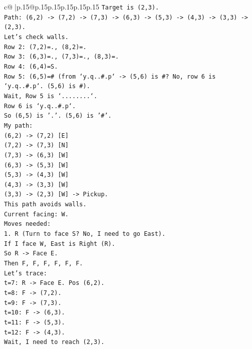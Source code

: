 \documentclass{article}
\begin{document}
{\begin{supertabular}{c@{$\;$}|p{.15\linewidth}@{}p{.15\linewidth}p{.15\linewidth}p{.15\linewidth}p{.15\linewidth}p{.15\linewidth}}
{{{\texttt{Target is (2,3).} \\
\texttt{Path: (6,2) {-}> (7,2) {-}> (7,3) {-}> (6,3) {-}> (5,3) {-}> (4,3) {-}> (3,3) {-}> (2,3).} \\
\texttt{Let's check walls.} \\
\texttt{Row 2: (7,2)=., (8,2)=.} \\
\texttt{Row 3: (6,3)=., (7,3)=., (8,3)=.} \\
\texttt{Row 4: (6,4)=S.} \\
\texttt{Row 5: (6,5)=\# (from `y.q..\#.p` {-}> (5,6) is \#? No, row 6 is `y.q..\#.p`. (5,6) is \#).} \\
\texttt{Wait, Row 5 is `........`.} \\
\texttt{Row 6 is `y.q..\#.p`.} \\
\texttt{So (6,5) is '.'. (5,6) is '\#'.} \\
\texttt{My path:} \\
\texttt{(6,2) {-}> (7,2) {[}E{]}} \\
\texttt{(7,2) {-}> (7,3) {[}N{]}} \\
\texttt{(7,3) {-}> (6,3) {[}W{]}} \\
\texttt{(6,3) {-}> (5,3) {[}W{]}} \\
\texttt{(5,3) {-}> (4,3) {[}W{]}} \\
\texttt{(4,3) {-}> (3,3) {[}W{]}} \\
\texttt{(3,3) {-}> (2,3) {[}W{]} {-}> Pickup.} \\
\texttt{This path avoids walls.} \\
\texttt{Current facing: W.} \\
\texttt{Moves needed:} \\
\texttt{1. R (Turn to face S? No, I need to go East).} \\
\texttt{If I face W, East is Right (R).} \\
\texttt{So R {-}> Face E.} \\
\texttt{Then F, F, F, F, F, F.} \\
\texttt{Let's trace:} \\
\texttt{t=7: R {-}> Face E. Pos (6,2).} \\
\texttt{t=8: F {-}> (7,2).} \\
\texttt{t=9: F {-}> (7,3).} \\
\texttt{t=10: F {-}> (6,3).} \\
\texttt{t=11: F {-}> (5,3).} \\
\texttt{t=12: F {-}> (4,3).} \\
\texttt{Wait, I need to reach (2,3).} \\
}}}
\end{supertabular}}
\end{document}
